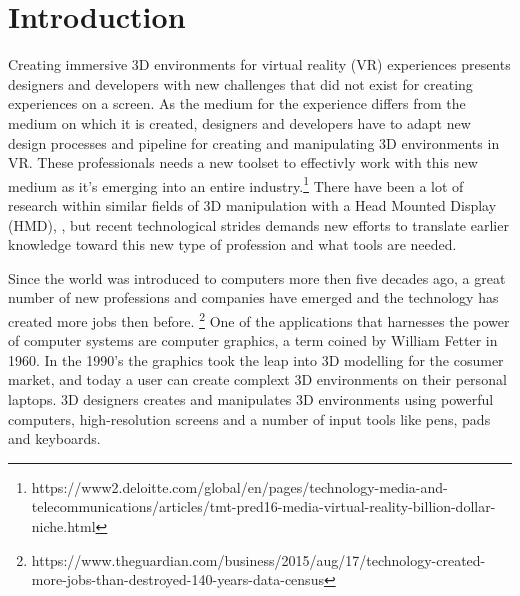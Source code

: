 
\chapter*{Introduction}
Creating immersive 3D environments for virtual reality (VR) experiences presents designers and developers with new challenges that did not exist for creating experiences on a screen. As the medium for the experience differs from the medium on which it is created, designers and developers have to adapt new design processes and pipeline for creating and manipulating 3D environments in VR. These professionals needs a new toolset to effectivly work with this new medium as it's emerging into an entire industry.\footnote{https://www2.deloitte.com/global/en/pages/technology-media-and-telecommunications/articles/tmt-pred16-media-virtual-reality-billion-dollar-niche.html} There have been a lot of research within similar fields of 3D manipulation with a Head Mounted Display (HMD),  \cite{relatedwork:kijimaand1997transition} \cite{relatedwork:bowman1996conceptual} \cite{relatedwork:stoakley1995virtual} \cite{relatedwork:mine1995isaac}, but recent technological strides demands new efforts to translate earlier knowledge toward this new type of profession and what tools are needed.

Since the world was introduced to computers more then five decades ago, a great number of new professions and companies have emerged and the technology has created more jobs then before. \footnote{https://www.theguardian.com/business/2015/aug/17/technology-created-more-jobs-than-destroyed-140-years-data-census} One of the applications that harnesses the power of computer systems are computer graphics, a term coined by William Fetter in 1960. \cite{3D_history:graphics_2017} In the 1990's the graphics took the leap into 3D modelling for the cosumer market, and today a user can create complext 3D environments on their personal laptops. 3D designers creates and manipulates 3D environments using powerful computers, high-resolution screens and a number of input tools like pens, pads and keyboards.


